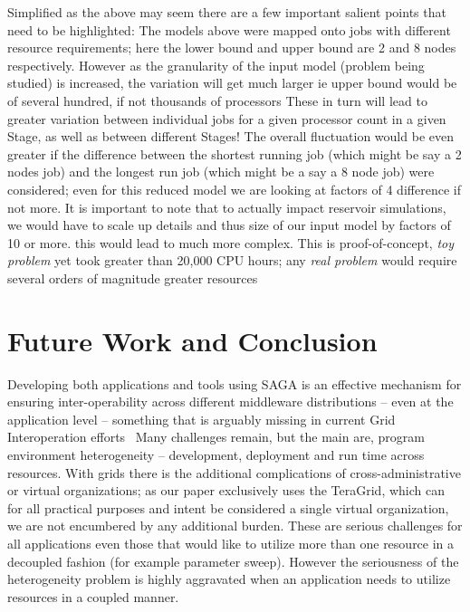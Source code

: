 \documentclass[conference,final]{IEEEtran}
\newcommand{\jha}[0]{}
\begin{document}
Simplified as the above may seem there are a few important salient
points that need to be highlighted: The models above were mapped onto
jobs with different resource requirements; here the lower bound and
upper bound are 2 and 8 nodes respectively. However as the granularity
of the input model (problem being studied) is increased, the variation
will get much larger ie upper bound would be of several hundred, if
not thousands of processors 
These in turn will lead to greater variation between individual jobs
for a given processor count in a given Stage, as well as between
different Stages!  The overall fluctuation would be even greater if
the difference between the shortest running job (which might be say a
2 nodes job) and the longest run job (which might be a say a 8 node
job) were considered; even for this reduced model we are looking at
factors of 4 difference if not more.  It is important to note that to
actually impact reservoir simulations, we would have to scale up
details and thus size of our input model by factors of 10 or more.
this would lead to much more complex.%
This is proof-of-concept, {\it toy problem} yet took greater than
20,000 CPU hours; any {\it real problem} would require several orders
of magnitude greater resources


\section{Future Work and Conclusion}

Developing both applications and tools using SAGA is an effective
mechanism for ensuring inter-operability across different middleware
distributions -- even at the application level -- something that is
arguably missing in current Grid Interoperation
efforts~\cite{gin_paper} Many challenges remain, but the main are,
program environment heterogeneity -- development, deployment and run
time across resources.  With grids there is the additional
complications of cross-administrative or virtual organizations; as our
paper exclusively uses the TeraGrid, which can for all practical
purposes and intent be considered a single virtual organization, we
are not encumbered by any additional burden. These are serious
challenges for all applications even those that would like to utilize
more than one resource in a decoupled fashion (for example parameter
sweep).  However the seriousness of the heterogeneity problem is
highly aggravated when an application needs to utilize resources in a
coupled manner.
\end{document}
